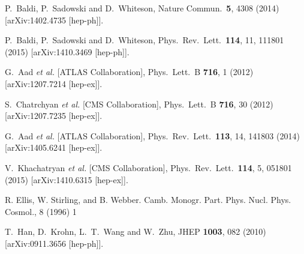   P.~Baldi, P.~Sadowski and D.~Whiteson,
  Nature Commun.\  {\bf 5}, 4308 (2014)
  [arXiv:1402.4735 [hep-ph]].

  P.~Baldi, P.~Sadowski and D.~Whiteson,
  Phys.\ Rev.\ Lett.\  {\bf 114}, 11, 111801 (2015)
  [arXiv:1410.3469 [hep-ph]].



  G.~Aad {\it et al.}  [ATLAS Collaboration],
  Phys.\ Lett.\ B {\bf 716}, 1 (2012)
  [arXiv:1207.7214 [hep-ex]].

  S.~Chatrchyan {\it et al.}  [CMS Collaboration],
  Phys.\ Lett.\ B {\bf 716}, 30 (2012)
  [arXiv:1207.7235 [hep-ex]].


  G.~Aad {\it et al.}  [ATLAS Collaboration],
  Phys.\ Rev.\ Lett.\  {\bf 113}, 14, 141803 (2014)
  [arXiv:1405.6241 [hep-ex]].


  V.~Khachatryan {\it et al.}  [CMS Collaboration],
  Phys.\ Rev.\ Lett.\  {\bf 114}, 5, 051801 (2015)
  [arXiv:1410.6315 [hep-ex]].


  R. Ellis, W. Stirling, and B. Webber.%
   Camb. Monogr. Part. Phys. Nucl. Phys. Cosmol., 8 (1996) 1

  T.~Han, D.~Krohn, L.~T.~Wang and W.~Zhu,
  JHEP {\bf 1003}, 082 (2010)
  [arXiv:0911.3656 [hep-ph]].

